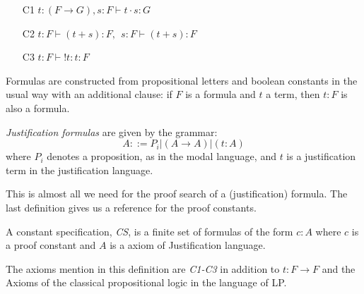 \begin{rules}\label{rules} 

\begin{itemize} Application, sum and positive introspection respectively.

	\item[C1] $t:(F \rightarrow G), s:F \vdash t \cdot s: G$
	\item[C2] $t:F \vdash (t +s):F, \:\: s:F \vdash (t+s):F$
	\item[C3] $t:F \vdash !t:t:F$
\end{itemize}

\end{rules}

Formulas are constructed from propositional letters and boolean constants in the usual way with an additional clause: if $F$ is a formula and $t$ a term, then $t:F$ is also a formula.

\begin{definition}\label{justification_formulas} \emph{Justification formulas} are given by the grammar:
\[
A ::= P_i|(A \rightarrow A) | (t:A)
\]
where $P_i$ denotes a proposition, as in the modal language, and $t$ is a justification term in the justification language.
\end{definition}

This is almost all we need for the proof search of a (justification) formula. The last definition gives us a reference for the proof constants.

\begin{definition}\label{cs-def} A constant specification, \emph{CS}, is a finite set of formulas of the form $c:A$ where $c$ is a proof constant and $A$ is a axiom of Justification language.
\end{definition}

The axioms mention in this definition are \emph{C1-C3} in addition to $t:F \rightarrow F$ and the Axioms of the classical propositional logic in the language of LP.

